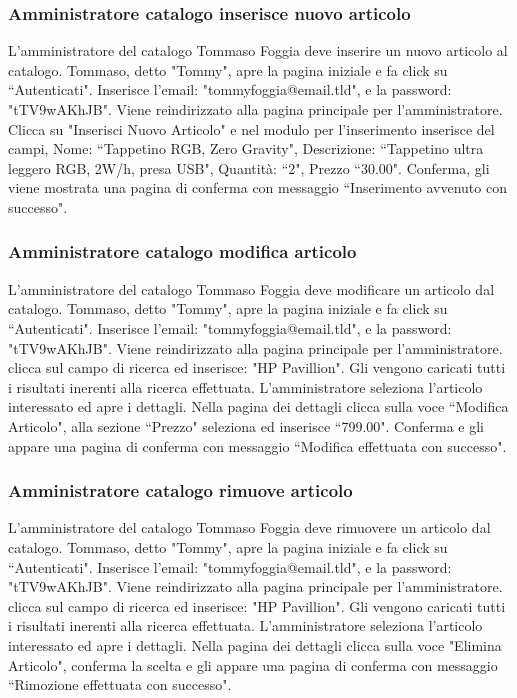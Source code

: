 \documentclass[12pt,a4paper]{article}
\begin{document}
\subsubsection{Amministratore catalogo inserisce nuovo articolo}
L'amministratore del catalogo Tommaso Foggia deve inserire un nuovo articolo al catalogo.
Tommaso, detto "Tommy", apre la pagina iniziale e fa click su ``Autenticati".
Inserisce l'email: "tommyfoggia@email.tld", e la password: "tTV9wAKhJB".
Viene reindirizzato alla pagina principale per l'amministratore.
Clicca su "Inserisci Nuovo Articolo" e nel modulo per l'inserimento inserisce del campi, Nome: ``Tappetino RGB, Zero Gravity", Descrizione: ``Tappetino ultra leggero RGB, 2W/h, presa USB",
Quantità: ``2", Prezzo ``30.00".
Conferma, gli viene mostrata una pagina di conferma con messaggio ``Inserimento avvenuto con successo".

\newpage

\subsubsection{Amministratore catalogo modifica articolo}
L'amministratore del catalogo Tommaso Foggia deve modificare un articolo dal catalogo.
Tommaso, detto "Tommy", apre la pagina iniziale e fa click su ``Autenticati".
Inserisce l'email: "tommyfoggia@email.tld", e la password: "tTV9wAKhJB".
Viene reindirizzato alla pagina principale per l'amministratore.
clicca sul campo di ricerca ed inserisce: "HP Pavillion".
Gli vengono caricati tutti i risultati inerenti alla ricerca effettuata.
L'amministratore seleziona l'articolo interessato ed apre i dettagli.
Nella pagina dei dettagli clicca sulla voce ``Modifica Articolo",
alla sezione ``Prezzo" seleziona ed inserisce ``799.00".
Conferma e gli appare una pagina di conferma con messaggio ``Modifica effettuata con successo".

\subsubsection{Amministratore catalogo rimuove articolo}
L'amministratore del catalogo Tommaso Foggia deve rimuovere un articolo dal catalogo.
Tommaso, detto "Tommy", apre la pagina iniziale e fa click su ``Autenticati".
Inserisce l'email: "tommyfoggia@email.tld", e la password: "tTV9wAKhJB".
Viene reindirizzato alla pagina principale per l'amministratore.
clicca sul campo di ricerca ed inserisce: "HP Pavillion".
Gli vengono caricati tutti i risultati inerenti alla ricerca effettuata.
L'amministratore seleziona l'articolo interessato ed apre i dettagli.
Nella pagina dei dettagli clicca sulla voce "Elimina Articolo",
conferma la scelta e gli appare una pagina di conferma con messaggio ``Rimozione effettuata con successo".
\end{document}
